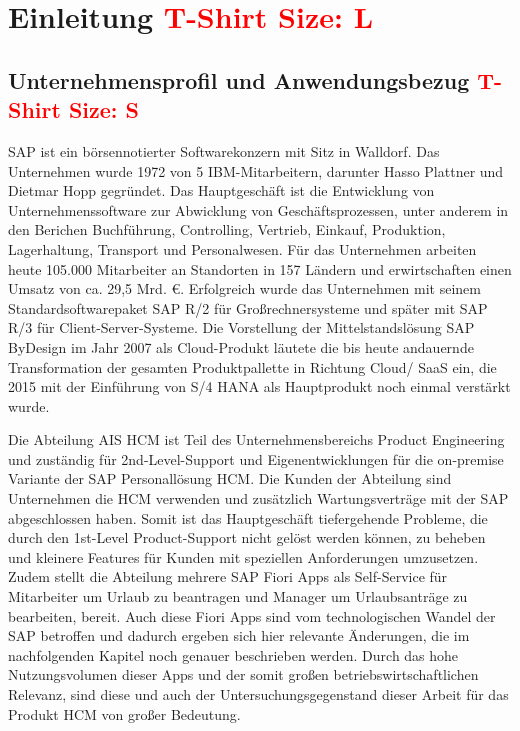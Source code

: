 \chapter{Einleitung \textcolor{red}{T-Shirt Size: L}}

\section{Unternehmensprofil und Anwendungsbezug \textcolor{red}{T-Shirt Size: S}}

SAP ist ein börsennotierter Softwarekonzern mit Sitz in Walldorf. Das Unternehmen wurde 1972 von 5 IBM-Mitarbeitern, darunter Hasso Plattner und Dietmar Hopp gegründet. Das Hauptgeschäft ist die Entwicklung von Unternehmenssoftware zur Abwicklung von Geschäftsprozessen, unter anderem in den Berichen Buchführung, Controlling, Vertrieb, Einkauf, Produktion, Lagerhaltung, Transport und Personalwesen. Für das Unternehmen arbeiten heute 105.000 Mitarbeiter an Standorten in 157 Ländern und erwirtschaften einen Umsatz von ca. 29,5 Mrd. \euro{}. Erfolgreich wurde das Unternehmen mit seinem Standardsoftwarepaket SAP R/2 für Gro{\ss}rechnersysteme und später mit SAP R/3 für Client-Server-Systeme. Die Vorstellung der Mittelstandslösung SAP ByDesign im Jahr 2007 als Cloud-Produkt läutete die bis heute andauernde Transformation der gesamten Produktpallette in Richtung Cloud/ SaaS ein, die 2015 mit der Einführung von S/4 HANA als Hauptprodukt noch einmal verstärkt wurde.

Die Abteilung AIS HCM ist Teil des Unternehmensbereichs Product Engineering und zuständig für 2nd-Level-Support und Eigenentwicklungen für die on-premise Variante der SAP Personallösung HCM. Die Kunden der Abteilung sind Unternehmen die HCM verwenden und zusätzlich Wartungsverträge mit der SAP abgeschlossen haben. Somit ist das Hauptgeschäft tiefergehende Probleme, die durch den 1st-Level Product-Support nicht gelöst werden können, zu beheben und kleinere Features für Kunden mit speziellen Anforderungen umzusetzen. Zudem stellt die Abteilung mehrere SAP Fiori Apps als Self-Service für Mitarbeiter \zB um Urlaub zu beantragen und Manager \zB um Urlaubsanträge zu bearbeiten, bereit. Auch diese Fiori Apps sind vom technologischen Wandel der SAP betroffen und dadurch ergeben sich hier relevante Änderungen, die im nachfolgenden Kapitel noch genauer beschrieben werden. Durch das hohe Nutzungsvolumen dieser Apps und der somit gro{\ss}en betriebswirtschaftlichen Relevanz, sind diese und auch der Untersuchungsgegenstand dieser Arbeit für das Produkt HCM von gro{\ss}er Bedeutung.

